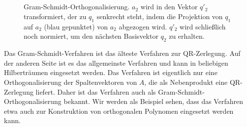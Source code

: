 \subsection{}

\begin{figure}
  \centering

  \caption{Gram-Schmidt-Orthogonalisierung. $a_2$ wird in den Vektor
    $q'_2$ transformiert, der zu $q_1$ senkrecht steht, indem die
    Projektion von $q_1$ auf $a_2$ (blau gepunktet) von $a_2$
    abgezogen wird. $q'_2$ wird schließlich noch normiert, um den
    nächsten Basisvektor $q_2$ zu erhalten.}
  \label{fig:gs}
\end{figure}

Das Gram-Schmidt-Verfahren ist das älteste Verfahren zur
QR-Zerlegung. Auf der anderen Seite ist es das allgemeinste Verfahren
und kann in beliebigen Hilberträumen eingesetzt werden. Das Verfahren
ist eigentlich nur eine Orthogonalisierung der Spaltenvektoren von
$A$, die als Nebenprodukt eine QR-Zerlegung liefert. Daher ist das
Verfahren auch als Gram-Schmidt-Orthogonalisierung bekannt. Wir werden
als Beispiel sehen, dass das Verfahren etwa auch zur Konstruktion von
orthogonalen Polynomen eingesetzt werden kann.


